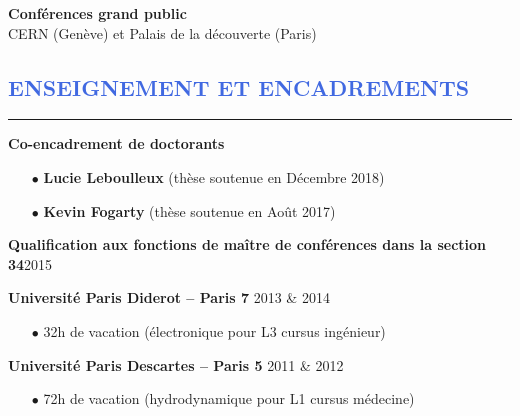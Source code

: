 \documentclass[11pt,a4paper, french]{article}
\begin{document}
\vspace{0.4cm}
\textbf{Conférences grand public}   \\
\hspace{0.3cm} CERN (Genève) et Palais de la découverte (Paris)\\





\textcolor{RoyalBlue}{\section{\large ENSEIGNEMENT ET ENCADREMENTS}
\vspace{-0.2cm}\hrule}
\vspace{0.4cm}

\textbf{Co-encadrement de doctorants}\\
\vspace{-0.3cm}

\begin{itemize} \itemsep 5pt
    \item[$\bullet$] \textbf{Lucie Leboulleux} (thèse soutenue en Décembre 2018)
    \item[$\bullet$] \textbf{Kevin Fogarty} (thèse soutenue en Août 2017)\\
\end{itemize}
\textbf{Qualification aux fonctions de maître de conférences dans la section 34}\hfill  2015

\vspace{0.3cm}
\textbf{Universit\'e Paris Diderot -- Paris 7} \hfill  		 2013 \& 2014
\begin{itemize} \itemsep 5pt
    \item[$\bullet$] 32h de vacation (électronique pour L3 cursus ingénieur)\\
\end{itemize}

\textbf{Universit\'e Paris Descartes -- Paris 5} \hfill  		 2011 \& 2012
\begin{itemize} \itemsep 5pt
    \item[$\bullet$] 72h de vacation (hydrodynamique pour L1 cursus médecine)\\
\end{itemize}
\end{document}
